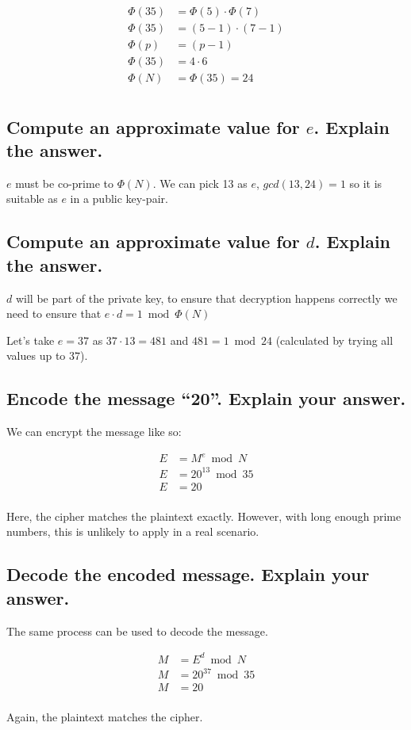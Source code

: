 \begin{align*}
\Phi(35) &= \Phi(5) \cdot \Phi(7) \\
\Phi(35) &= (5-1) \cdot (7-1)\\
\Phi(p) &= (p-1) \\
\Phi(35) &= 4 \cdot 6\\
\Phi(N) &= \Phi(35) = 24\\
\end{align*}

\subsection{Compute an approximate value for \texorpdfstring{$e$}{e}. Explain the answer.}

$e$ must be co-prime to $\Phi(N)$. We can pick 13 as $e$, $gcd(13,24) = 1$ so it is suitable as $e$ in a public key-pair.

\subsection{Compute an approximate value for \texorpdfstring{$d$}{d}. Explain the answer.}

$d$ will be part of the private key, to ensure that decryption happens correctly we need to ensure that $e \cdot d=1 \bmod \Phi(N)$

Let’s take $e=37$ as $37 \cdot 13=481$ and $481=1 \bmod 24$ (calculated by trying all values up to $37$).

\subsection{Encode the message ``20''. Explain your answer.}
We can encrypt the message like so:

\begin{align*}
	E &= M^e \bmod N\\
	E &= 20^{13} \bmod 35 \\
	E &= 20\\
\end{align*}

Here, the cipher matches the plaintext exactly. However, with long enough prime numbers, this is unlikely to apply in a real scenario.

\subsection{Decode the encoded message. Explain your answer.}

The same process can be used to decode the message.

\begin{align*}
	M &= E^d \bmod N \\
	M &= 20^{37} \bmod 35 \\
	M &= 20 \\
\end{align*}

Again, the plaintext matches the cipher.


